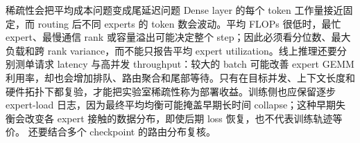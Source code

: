 \begin{warningbox}{稀疏性会把平均成本问题变成尾延迟问题}
Dense layer 的每个 token 工作量接近固定，而 routing 后不同 experts 的 token 数会波动。平均 FLOPs 很低时，最忙 expert、最慢通信 rank 或容量溢出可能决定整个 step；因此必须看分位数、最大负载和跨 rank variance，而不能只报告平均 expert utilization。线上推理还要分别测单请求 latency 与高并发 throughput：较大的 batch 可能改善 expert GEMM 利用率，却也会增加排队、路由聚合和尾部等待。只有在目标并发、上下文长度和硬件拓扑下都复验，才能把实验室稀疏性称为部署收益。训练侧也应保留逐步 expert-load 日志，因为最终平均均衡可能掩盖早期长时间 collapse；这种早期失衡会改变各 expert 接触的数据分布，即使后期 loss 恢复，也不代表训练轨迹等价。
还要结合多个 checkpoint 的路由分布复核。
\end{warningbox}

